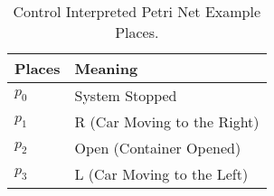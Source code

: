 \begin{table}[htbp]
\caption{Control Interpreted Petri Net Example Places.}
\centering
\begin{tabular}{M{5cm}M{10cm}}
Places & Meaning\\
\hline
\hyperlink{cipnExampleNet:p0m1}{\hypertarget{cipnExampleTable:p0m1}{$p_{0}$}} & System Stopped\\
\hyperlink{cipnExampleNet:p1}{\hypertarget{cipnExampleTable:p1}{$p_{1}$}} & R (Car Moving to the Right)\\
\hyperlink{cipnExampleNet:p2}{\hypertarget{cipnExampleTable:p2}{$p_{2}$}} & Open (Container Opened)\\
\hyperlink{cipnExampleNet:p3}{\hypertarget{cipnExampleTable:p3}{$p_{3}$}} & L (Car Moving to the Left)\\
\end{tabular}
\end{table}
